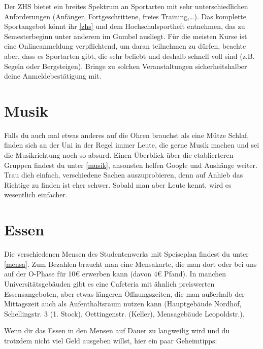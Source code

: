 Der ZHS bietet ein breites Spektrum an Sportarten mit sehr unterschiedlichen Anforderungen (Anfänger, Fortgeschrittene, freies Training,\ldots). Das komplette Sportangebot könnt ihr \ref{zhs} und dem Hochschulsportheft entnehmen, das zu Semesterbeginn unter anderem im Gumbel ausliegt. Für die meisten Kurse ist eine Onlineanmeldung verpflichtend, um daran teilnehmen zu dürfen, beachte aber, dass es Sportarten gibt, die sehr beliebt und deshalb schnell voll sind (z.B. Segeln oder Bergsteigen). Bringe zu solchen Veranstaltungen sicherheitshalber deine Anmeldebestätigung mit.

\begin{urlList}
\end{urlList}

\section{Musik}
Falls du auch mal etwas anderes auf die Ohren brauchst als eine Mütze Schlaf, finden sich an der Uni in der Regel immer Leute, die gerne Musik machen und sei die Musikrichtung noch so absurd. Einen Überblick über die etablierteren Gruppen findest du unter \ref{musik}, ansonsten helfen Google und Aushänge weiter. Trau dich einfach, verschiedene Sachen auszuprobieren, denn auf Anhieb das Richtige zu finden ist eher schwer. Sobald man aber Leute kennt, wird es wesentlich einfacher.

\begin{urlList}
\end{urlList}


\section{Essen}

Die verschiedenen Mensen des Studentenwerks mit Speiseplan findest du unter \ref{mensa}. Zum Bezahlen braucht man eine Mensakarte, die man dort oder bei uns auf der O-Phase für 10€ erwerben kann (davon 4€ Pfand). In manchen Universitätsgebäuden gibt es eine Cafeteria mit ähnlich preiswerten Essensangeboten, aber etwas längeren Öffnungszeiten, die man außerhalb der Mittagszeit auch als Aufenthaltsraum nutzen kann (Hauptgebäude Nordhof, Schellingstr. 3 (1. Stock), Oettingenstr. (Keller), Mensagebäude Leopoldstr.).

Wenn dir das Essen in den Mensen auf Dauer zu langweilig wird und du trotzdem nicht viel Geld ausgeben willst, hier ein paar Geheimtipps:

